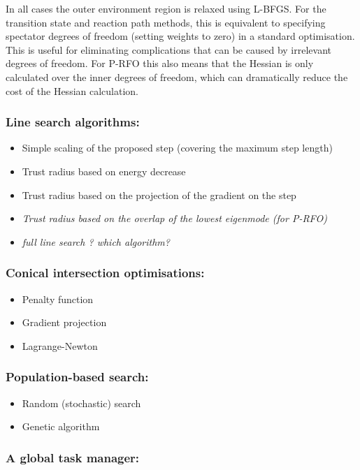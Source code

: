 \documentclass{article}
\begin{document}
In all cases the outer environment region is relaxed using L-BFGS. For the transition 
state and reaction path methods, this is equivalent to specifying spectator degrees 
of freedom (setting weights to zero) in a standard optimisation. This is useful for 
eliminating complications that can be caused by irrelevant degrees of freedom. For 
P-RFO this also means that the Hessian is only calculated over the inner degrees of 
freedom, which can dramatically reduce the cost of the Hessian calculation.

\subsubsection{Line search algorithms:}
\begin{itemize}
\item Simple scaling of the proposed step (covering the maximum step length)
\item Trust radius based on energy decrease
\item Trust radius based on the projection of the gradient on the step
\item \emph{Trust radius based on the overlap of the lowest eigenmode (for P-RFO)}
\item \emph{full line search ? which algorithm?}
\end{itemize}

\subsubsection{Conical intersection optimisations:}
\begin{itemize}
\item Penalty function
\item Gradient projection
\item Lagrange-Newton
\end{itemize}

\subsubsection{Population-based search:}
\begin{itemize}
\item Random (stochastic) search \cite{brooks57,luusj73}
\item Genetic algorithm \cite{holland75,goldberg89,haupth98}
\end{itemize}

\subsubsection{A global task manager:}
\end{document}
